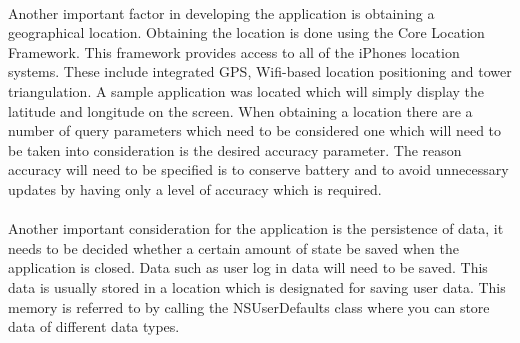 \documentclass[12pt]{article}
\begin{document}
\paragraph{}
\label{par:First Paragraph}

Another important factor in developing the application is obtaining a geographical location. Obtaining the location is done using the Core Location Framework. This framework provides access to all of the iPhones location systems. These include integrated GPS, Wifi-based location positioning and tower triangulation. 
A sample application was located which will simply display the latitude and longitude on the screen. When obtaining a location there are a number of query parameters which need to be considered  one which will need to be taken into consideration is the desired accuracy parameter. The reason accuracy will need to be specified is to conserve battery and to avoid unnecessary updates by having only a level of accuracy which is required.

\paragraph{}
\label{par:First Paragraph}

Another important consideration for the application is the persistence of data, it needs to be decided whether a certain amount of state be saved when the application is closed. Data such as user log in data will need to be saved. This data is usually stored in a location which is designated for saving user data. This memory is referred to by calling the NSUserDefaults class where you can store data of different data types.



\end{document}
